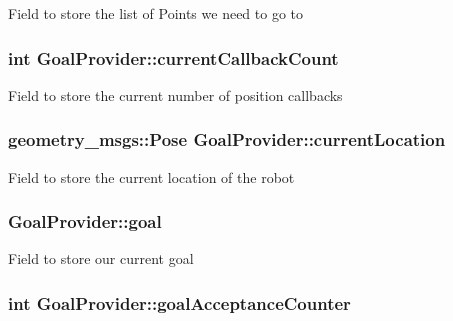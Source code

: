 \-Field to store the list of \-Points we need to go to \hypertarget{classGoalProvider_aca962edcdb380d56a7e551de7b5c36a6}{
\subsubsection[{current\-Callback\-Count}]{\setlength{\rightskip}{0pt plus 5cm}int {\bf \-Goal\-Provider\-::current\-Callback\-Count}}}\label{classGoalProvider_aca962edcdb380d56a7e551de7b5c36a6}
\-Field to store the current number of position callbacks \hypertarget{classGoalProvider_a043ea6fbbd89e54ea39501ae30da8774}{
\subsubsection[{current\-Location}]{\setlength{\rightskip}{0pt plus 5cm}geometry\-\_\-msgs\-::\-Pose {\bf \-Goal\-Provider\-::current\-Location}}}\label{classGoalProvider_a043ea6fbbd89e54ea39501ae30da8774}
\-Field to store the current location of the robot \hypertarget{classGoalProvider_a7c8eb368dbd85c32f1000fead79190dc}{
\subsubsection[{goal}]{ {\bf \-Goal\-Provider\-::goal}}}\label{classGoalProvider_a7c8eb368dbd85c32f1000fead79190dc}
\-Field to store our current goal \hypertarget{classGoalProvider_a27a290eb0662fbb7dc1dbe696f9fcb00}{
\subsubsection[{goal\-Acceptance\-Counter}]{\setlength{\rightskip}{0pt plus 5cm}int {\bf \-Goal\-Provider\-::goal\-Acceptance\-Counter}}}\label{classGoalProvider_a27a290eb0662fbb7dc1dbe696f9fcb00}
